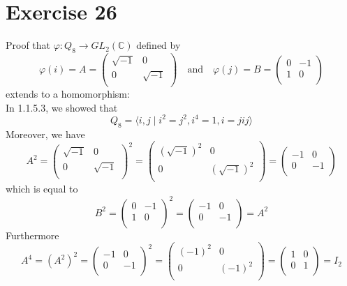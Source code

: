 \documentclass{article}
\newcommand{\C}{\mathbb{C}}
\begin{document}
    \section*{Exercise 26}
    Proof that $\varphi: Q_8 \to GL_2(\C)$ defined by
    \[  \varphi(i) = A =\begin{pmatrix}
        \sqrt{-1} & 0 \\
        0 & \sqrt{-1} \\
    \end{pmatrix}
    \quad \text{and} \quad
    \varphi(j) = B =\begin{pmatrix}
        0 & -1 \\
        1 & 0 \\
    \end{pmatrix} \]
    extends to a homomorphism: \\
    In 1.1.5.3, we showed that
    \[  Q_8 = \langle i, j \mid i^2 = j^2, i^4 = 1, i = jij \rangle \]
    Moreover, we have
    \[  A^2 = \begin{pmatrix}
        \sqrt{-1} & 0 \\
        0 & \sqrt{-1} \\
    \end{pmatrix}^2
    = \begin{pmatrix}
        (\sqrt{-1})^2 & 0 \\
        0 & (\sqrt{-1})^2 \\
    \end{pmatrix}
    = \begin{pmatrix}
        -1 & 0 \\
        0 & -1 \\
    \end{pmatrix} \]
    which is equal to
    \[  B^2 = \begin{pmatrix}
        0 & -1 \\
        1 & 0 \\
    \end{pmatrix}^2
    = \begin{pmatrix}
        -1 & 0 \\
        0 & -1 \\
    \end{pmatrix} = A^2 \]
    Furthermore
    \[  A^4 = (A^2)^2 = \begin{pmatrix}
        -1 & 0 \\
        0 & -1 \\
    \end{pmatrix}^2
    = \begin{pmatrix}
        (-1)^2 & 0 \\
        0 & (-1)^2 \\
    \end{pmatrix}
    = \begin{pmatrix}
        1 & 0 \\
        0 & 1 \\
    \end{pmatrix} = I_2 \]
\end{document}
